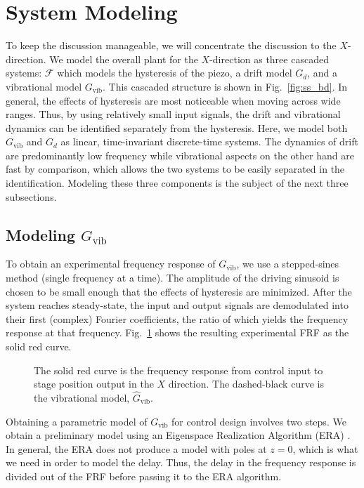 \documentclass[twocolumn,twoside]{IEEEtran}
\newcommand{\Gv}{\ensuremath{G_{\text{vib}}}\xspace}
\begin{document}
\section{System Modeling}
To keep the discussion manageable, we will concentrate the discussion to the $X$-direction. We model the overall plant for the $X$-direction as three cascaded systems: $\mathcal{F}$ which models the hysteresis of the piezo, a drift model $G_d$, and a vibrational model $\Gv$. This cascaded structure is shown in Fig.~\ref{fig:ss_bd}. In general, the effects of hysteresis are most noticeable when moving across wide ranges. Thus, by using relatively small input signals, the drift and vibrational dynamics can be identified separately from the hysteresis. Here, we model both $\Gv$ and $G_d$ as linear, time-invariant discrete-time systems. The dynamics of drift are predominantly low frequency while vibrational aspects on the other hand are fast by comparison, which allows the two systems to be easily separated in the identification.
 Modeling these three components is the subject of the next three subsections.


\subsection{Modeling \Gv}\label{sec:vib_model}
To obtain an experimental frequency response of $\Gv$, we use a stepped-sines method (single frequency at a time). The amplitude of the driving sinusoid is chosen to be small enough that the effects of hysteresis are minimized. After the system reaches steady-state, the input and output signals are demodulated into their first (complex) Fourier coefficients, the ratio of which yields the frequency response at that frequency. Fig.~\ref{fig:Guz2stage_frf} shows the resulting experimental FRF as the solid red curve.

\begin{figure}
  \centering
  
  \caption{The solid red curve is the frequency response from control input to stage position output in the $X$ direction. The dashed-black curve is the vibrational model, $\hat{G}_{\textrm{vib}}$.}
  \label{fig:Guz2stage_frf}
\end{figure}

Obtaining a parametric model of $\Gv$ for control design involves two steps. We obtain a preliminary model using an Eigenspace Realization Algorithm (ERA) \cite{Jacques_sysidfrf}. In general, the ERA does not produce a model with poles at $z=0$, which is what we need in order to model the delay. Thus, the delay in the frequency response is divided out of the FRF before passing it to the ERA algorithm.
\end{document}
